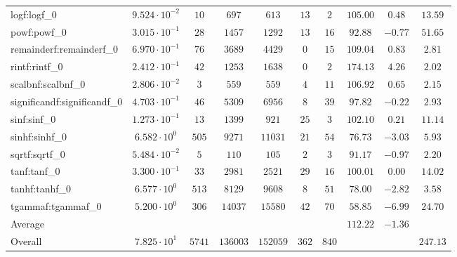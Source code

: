 \begin{tabular}{|l|c|c|c|c|c|c|c|c|c|}
logf:logf\_0                 & $ 9.524 \cdot 10^{-2} $ & $ 10     $ & $ 697    $ & $ 613    $ & $ 13  $ & $ 2   $ & $ 105.00      $ & $ 0.48    $ & $ 13.59   $ \\
powf:powf\_0                 & $ 3.015 \cdot 10^{-1} $ & $ 28     $ & $ 1457   $ & $ 1292   $ & $ 13  $ & $ 16  $ & $ 92.88       $ & $ -0.77   $ & $ 51.65   $ \\
remainderf:remainderf\_0     & $ 6.970 \cdot 10^{-1} $ & $ 76     $ & $ 3689   $ & $ 4429   $ & $ 0   $ & $ 15  $ & $ 109.04      $ & $ 0.83    $ & $ 2.81    $ \\
rintf:rintf\_0               & $ 2.412 \cdot 10^{-1} $ & $ 42     $ & $ 1253   $ & $ 1638   $ & $ 0   $ & $ 2   $ & $ 174.13      $ & $ 4.26    $ & $ 2.02    $ \\
scalbnf:scalbnf\_0           & $ 2.806 \cdot 10^{-2} $ & $ 3      $ & $ 559    $ & $ 559    $ & $ 4   $ & $ 11  $ & $ 106.92      $ & $ 0.65    $ & $ 2.15    $ \\
significandf:significandf\_0 & $ 4.703 \cdot 10^{-1} $ & $ 46     $ & $ 5309   $ & $ 6956   $ & $ 8   $ & $ 39  $ & $ 97.82       $ & $ -0.22   $ & $ 2.93    $ \\
sinf:sinf\_0                 & $ 1.273 \cdot 10^{-1} $ & $ 13     $ & $ 1399   $ & $ 921    $ & $ 25  $ & $ 3   $ & $ 102.10      $ & $ 0.21    $ & $ 11.14   $ \\
sinhf:sinhf\_0               & $ 6.582 \cdot 10^{0}  $ & $ 505    $ & $ 9271   $ & $ 11031  $ & $ 21  $ & $ 54  $ & $ 76.73       $ & $ -3.03   $ & $ 5.93    $ \\
sqrtf:sqrtf\_0               & $ 5.484 \cdot 10^{-2} $ & $ 5      $ & $ 110    $ & $ 105    $ & $ 2   $ & $ 3   $ & $ 91.17       $ & $ -0.97   $ & $ 2.20    $ \\
tanf:tanf\_0                 & $ 3.300 \cdot 10^{-1} $ & $ 33     $ & $ 2981   $ & $ 2521   $ & $ 29  $ & $ 16  $ & $ 100.01      $ & $ 0.00    $ & $ 14.02   $ \\
tanhf:tanhf\_0               & $ 6.577 \cdot 10^{0}  $ & $ 513    $ & $ 8129   $ & $ 9608   $ & $ 8   $ & $ 51  $ & $ 78.00       $ & $ -2.82   $ & $ 3.58    $ \\
tgammaf:tgammaf\_0           & $ 5.200 \cdot 10^{0}  $ & $ 306    $ & $ 14037  $ & $ 15580  $ & $ 42  $ & $ 70  $ & $ 58.85       $ & $ -6.99   $ & $ 24.70   $ \\
\hline
Average                      & $                     $ & $        $ & $        $ & $        $ & $     $ & $     $ & $ 112.22      $ & $ -1.36   $ & $         $ \\
\hline
Overall                      & $ 7.825 \cdot 10^{1}  $ & $ 5741   $ & $ 136003 $ & $ 152059 $ & $ 362 $ & $ 840 $ & $             $ & $         $ & $ 247.13  $ \\
\hline
\end{tabular}
